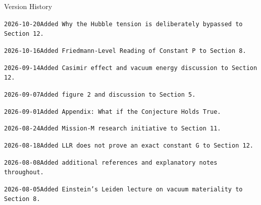 \documentclass[12pt,leqno]{article}
\begin{document}
{	\vskip 0.1in

	
	\begin{footnotesize}
		\vspace{0.1em}
		\noindent{\color{lightgray}\rule{\linewidth}{0.3pt}}
		\vspace{0.1em}
		
		\noindent
		Version History 
		
		\vspace{0.1em}
		\texttt{2026-10-20\hspace{1.2em}Added Why the Hubble tension is deliberately bypassed to Section 12.}
				
		\vspace{0.1em}
		\texttt{2026-10-16\hspace{1.2em}Added Friedmann-Level Reading of Constant P to Section 8.}
		
		\vspace{0.1em}
		\texttt{2026-09-14\hspace{1.2em}Added Casimir effect and vacuum energy discussion to Section 12.}
		
		\vspace{0.1em}
		\texttt{2026-09-07\hspace{1.2em}Added figure 2 and discussion to Section 5.}
		
		\vspace{0.1em}
		\texttt{2026-09-01\hspace{1.2em}Added Appendix: What if the Conjecture Holds True.}
		
		\vspace{0.1em}
		\texttt{2026-08-24\hspace{1.2em}Added Mission-M research initiative to Section 11.}
		
		\vspace{0.1em}
		\texttt{2026-08-18\hspace{1.2em}Added LLR does not prove an exact constant G to Section 12.}

		\vspace{0.1em}
		\texttt{2026-08-08\hspace{1.2em}Added additional references and explanatory notes throughout.}
		
		\vspace{0.1em}
		\texttt{2026-08-05\hspace{1.2em}Added Einstein's Leiden lecture on vacuum materiality to Section 8.}
		

\end{footnotesize}}
\end{document}
